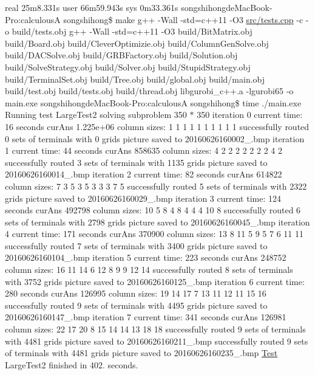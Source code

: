 real 25m8.\+331s user 66m59.\+943s sys 0m33.\+361s songshihongde\+Mac\+Book-\/\+Pro\+:calculousA songshihong\$ make g++ -\/\+Wall -\/std=c++11 -\/\+O3 \hyperlink{tests_8cpp}{src/tests.\+cpp} -\/c -\/o build/tests.\+obj g++ -\/\+Wall -\/std=c++11 -\/\+O3 build/\+Bit\+Matrix.\+obj build/\+Board.\+obj build/\+Clever\+Optimizie.\+obj build/\+Column\+Gen\+Solve.\+obj build/\+D\+A\+C\+Solve.\+obj build/\+G\+R\+B\+Factory.\+obj build/\+Solution.\+obj build/\+Solve\+Strategy.\+obj build/\+Solver.\+obj build/\+Stupid\+Strategy.\+obj build/\+Terminal\+Set.\+obj build/\+Tree.\+obj build/global.\+obj build/main.\+obj build/test.\+obj build/tests.\+obj build/thread.\+obj libgurobi\+\_\+c++.a -\/lgurobi65 -\/o main.\+exe songshihongde\+Mac\+Book-\/\+Pro\+:calculousA songshihong\$ time ./main.exe Running test Large\+Test2 solving subproblem 350 $\ast$ 350 iteration 0 current time\+: 16 seconds cur\+Ans 1.\+225e+06 column sizes\+: 1 1 1 1 1 1 1 1 1 1 successfully routed 0 sets of terminals with 0 grids picture saved to 20160626160002\+\_.\+bmp iteration 1 current time\+: 44 seconds cur\+Ans 858635 column sizes\+: 4 2 2 2 2 2 2 2 4 2 successfully routed 3 sets of terminals with 1135 grids picture saved to 20160626160014\+\_.\+bmp iteration 2 current time\+: 82 seconds cur\+Ans 614822 column sizes\+: 7 3 5 3 5 3 3 3 7 5 successfully routed 5 sets of terminals with 2322 grids picture saved to 20160626160029\+\_.\+bmp iteration 3 current time\+: 124 seconds cur\+Ans 492798 column sizes\+: 10 5 8 4 8 4 4 4 10 8 successfully routed 6 sets of terminals with 2798 grids picture saved to 20160626160045\+\_.\+bmp iteration 4 current time\+: 171 seconds cur\+Ans 370900 column sizes\+: 13 8 11 5 9 5 7 6 11 11 successfully routed 7 sets of terminals with 3400 grids picture saved to 20160626160104\+\_.\+bmp iteration 5 current time\+: 223 seconds cur\+Ans 248752 column sizes\+: 16 11 14 6 12 8 9 9 12 14 successfully routed 8 sets of terminals with 3752 grids picture saved to 20160626160125\+\_.\+bmp iteration 6 current time\+: 280 seconds cur\+Ans 126995 column sizes\+: 19 14 17 7 13 11 12 11 15 16 successfully routed 9 sets of terminals with 4495 grids picture saved to 20160626160147\+\_.\+bmp iteration 7 current time\+: 341 seconds cur\+Ans 126981 column sizes\+: 22 17 20 8 15 14 14 13 18 18 successfully routed 9 sets of terminals with 4481 grids picture saved to 20160626160211\+\_.\+bmp successfully routed 9 sets of terminals with 4481 grids picture saved to 20160626160235\+\_.\+bmp \hyperlink{classTest}{Test} Large\+Test2 finished in 402. seconds.

